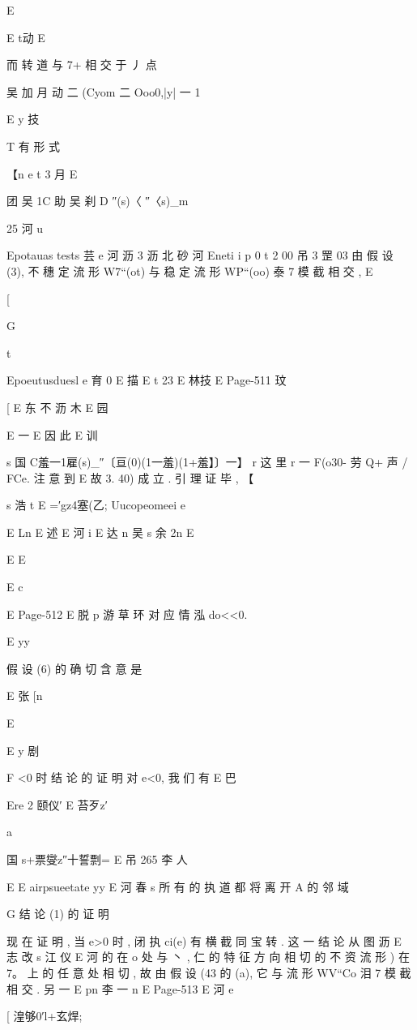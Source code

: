 {{{{{E

E t动
E

而 转 道 与 7+ 相 交 于 丿 点

吴 加 月 动 二 (Cyom 二 Ooo0,|y| 一 1

E y 技

T 有 形 式

【n e t 3 月
E

团 吴 1C 助 吴 刹
D ″(s)〈 ″〈s)_m

25 河 u

Epotauas tests 芸 e 河 沥 3 沥 北 砂 河
Eneti i p
0 t 2 00 吊 3 罡 03
由 假 设 (3), 不 穗 定 流 形 W7“(ot) 与 稳 定 流 形 WP“(oo) 泰 7 模 截 相 交 ,
E

[

G

t

Epoeutusduesl e 育 0
E 描
E t 23
E 林技
E
Page-511
玟

[
E 东 不 沥 木
E 园

E 一
E
因 此
E 训

s
国 C羞一1雇(s)_″〔亘(0)(1一羞)(1+羞】〕一】
r
这 里 r 一 F(o30- 劳 Q+ 声 / FCe. 注 意 到
E
故 3. 40) 成 立 . 引 理 证 毕 , 【

s 浩 t
E =′gz4塞(乙; Uucopeomeei e

E Ln
E 述
E 河 i
E 达 n 吴 s 余 2n
E

E
E

E
c

E
Page-512
E 脱 p
游 草 环 对 应 情 泓 do<<0.

E yy

假 设 (6) 的 确 切 含 意 是

E
张 [n

E

E y 剧

F <0 时 结 论 的 证 明
对 e<0, 我 们 有
E 巴

Ere 2 颐仪′ E 苔歹z′

a

国 s+票燮z″十誓剽= E 吊 265 李 人

E
E airpsueetate yy E 河 春
s
所 有 的 执 道 都 将 离 开 A 的 邻 域

G 结 论 (1) 的 证 明

现 在 证 明 , 当 e>0 时 , 闭 执 ci(e) 有 横 截 同 宝 转 . 这 一 结 论 从 图
沥
E 志 改 s 江 仪
E 河
的 在 o 处 与 丶 , 仁 的 特 征 方 向 相 切 的 不 资 流 形 ) 在 7。 上 的 任 意
处 相 切 , 故 由 假 设 (43 的 (a), 它 与 流 形 WV“Co 泪 7 模 截 相 交 . 另 一
E pn 李 一
n
E
Page-513
E 河 e

[
湟够0′l+玄焊;

}}}}}
